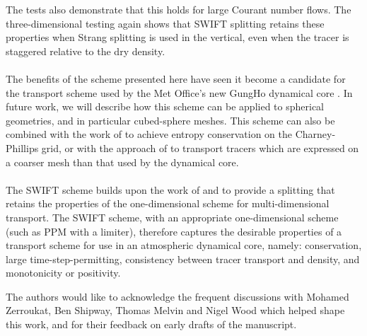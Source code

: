 \documentclass{ametsocV6.1}
\begin{document}
The tests also demonstrate that this holds for large Courant number flows. The three-dimensional testing again shows that SWIFT splitting retains these properties when Strang splitting is used in the vertical, even when the tracer is staggered relative to the dry density. \\
\\
The benefits of the scheme presented here have seen it become a candidate for the transport scheme used by the Met Office's new GungHo dynamical core \citep{melvin2024mixed}.
In future work, we will describe how this scheme can be applied to spherical geometries, and in particular cubed-sphere meshes.
This scheme can also be combined with the work of \citet{thuburn2022numerical} to achieve entropy conservation on the Charney-Phillips grid, or with the approach of \citet{brown2023physics} to transport tracers which are expressed on a coarser mesh than that used by the dynamical core. \\
\\
The SWIFT scheme builds upon the work of \citet{lin1996ffsl,leonard1996cosmic} and \citet{skamarock2006limiters} to provide a splitting that retains the properties of the one-dimensional scheme for multi-dimensional transport.
The SWIFT scheme, with an appropriate one-dimensional scheme (such as PPM with a limiter), therefore captures the desirable properties of a transport scheme for use in an atmospheric dynamical core, namely: conservation, large time-step-permitting, consistency between tracer transport and density, and monotonicity or positivity. 

\clearpage
\acknowledgments

The authors would like to acknowledge the frequent discussions with Mohamed Zerroukat, Ben Shipway, Thomas Melvin and Nigel Wood which helped shape this work, and for their feedback on early drafts of the manuscript.
\end{document}
